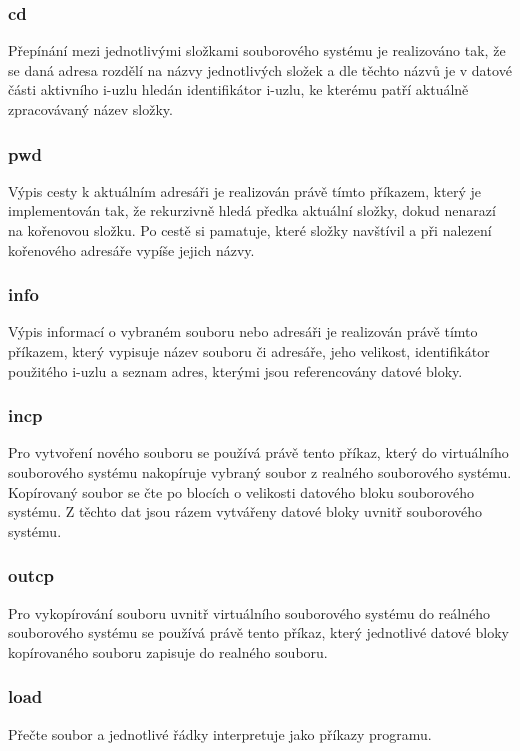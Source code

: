 \documentclass[12pt, a4paper]{article}
\begin{document}
		\subsubsection{cd}
		Přepínání mezi jednotlivými složkami souborového systému je realizováno tak, že se daná adresa rozdělí na názvy jednotlivých složek a dle těchto názvů je v datové části aktivního i-uzlu hledán identifikátor i-uzlu, ke kterému patří aktuálně zpracovávaný název složky.
		
		\subsubsection{pwd}
		Výpis cesty k aktuálním adresáři je realizován právě tímto příkazem, který je implementován tak, že rekurzivně hledá předka aktuální složky, dokud nenarazí na kořenovou složku. Po cestě si pamatuje, které složky navštívil a při nalezení kořenového adresáře vypíše jejich názvy.
		
		\subsubsection{info}
		Výpis informací o vybraném souboru nebo adresáři je realizován právě tímto příkazem, který vypisuje název souboru či adresáře, jeho velikost, identifikátor použitého i-uzlu a seznam adres, kterými jsou referencovány datové bloky.
		
		\subsubsection{incp}
	Pro vytvoření nového souboru se používá právě tento příkaz, který do virtuálního souborového systému nakopíruje vybraný soubor z realného souborového systému. Kopírovaný soubor se čte po blocích o velikosti datového bloku souborového systému. Z těchto dat jsou rázem vytvářeny datové bloky uvnitř souborového systému.
				
		\subsubsection{outcp}
	Pro vykopírování souboru uvnitř virtuálního souborového systému do reálného souborového systému se používá právě tento příkaz, který jednotlivé datové bloky kopírovaného souboru zapisuje do realného souboru.
		
		\subsubsection{load}
	Přečte soubor a jednotlivé řádky interpretuje jako příkazy programu.
		 
\end{document}
